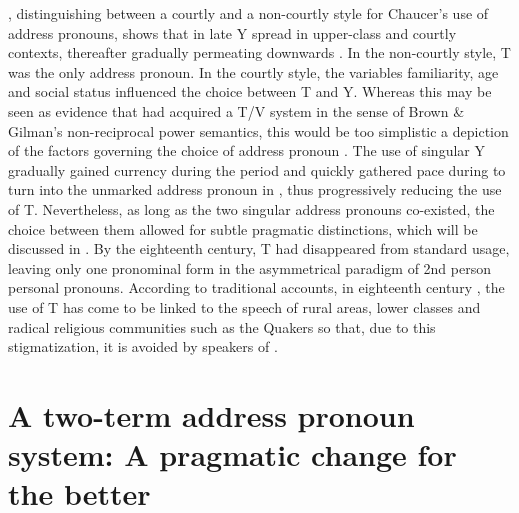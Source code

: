 \documentclass[output=paper,hidelinks]{langscibook}
\begin{document}
\textcites[17--22]{Burnley1983}[28--29]{Burnley2003}, distinguishing between a courtly and a non-courtly style for Chaucer’s use of address pronouns, shows that in late  Y spread in upper-class and courtly contexts, thereafter gradually permeating downwards \citep[see also][106]{Leith1997}. In the non-courtly style, T was the only address pronoun. In the courtly style, the variables familiarity, age and social status influenced the choice between T and Y. Whereas this may be seen as evidence that  had acquired a T/V system in the sense of Brown \& Gilman’s non-reciprocal power semantics, this would be too simplistic a depiction of the factors governing the choice of address pronoun \citep[473]{Traugott2012}. The use of singular Y gradually gained currency during the  period and quickly gathered pace during  to turn into the unmarked address pronoun in  \citep[150]{Lass1999}, thus progressively reducing the use of T. Nevertheless, as long as the two singular address pronouns co-existed, the choice between them allowed for subtle pragmatic distinctions, which will be discussed in . By the eighteenth century, T had disappeared from standard usage, leaving only one pronominal form in the asymmetrical paradigm of 2nd person personal pronouns. According to traditional accounts, in eighteenth century , the use of T has come to be linked to the speech of rural areas, lower classes and radical religious communities such as the Quakers \citep[76]{Wales1996} so that, due to this stigmatization, it is avoided by speakers of .

\section{A two-term address pronoun system: A pragmatic change for the better}\label{sec:eh:4}\largerpage
\end{document}
